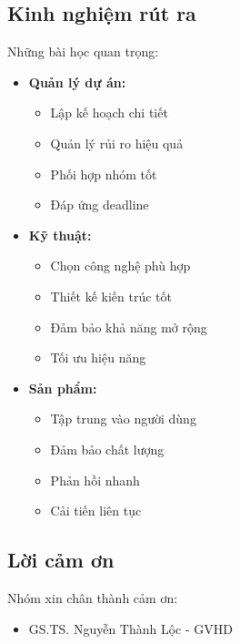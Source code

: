 \subsection{Kinh nghiệm rút ra}
\hspace{0.5cm}Những bài học quan trọng:

\begin{itemize}
    \item \textbf{Quản lý dự án:}
    \begin{itemize}
        \item Lập kế hoạch chi tiết
        \item Quản lý rủi ro hiệu quả
        \item Phối hợp nhóm tốt
        \item Đáp ứng deadline
    \end{itemize}
    
    \item \textbf{Kỹ thuật:}
    \begin{itemize}
        \item Chọn công nghệ phù hợp
        \item Thiết kế kiến trúc tốt
        \item Đảm bảo khả năng mở rộng
        \item Tối ưu hiệu năng
    \end{itemize}
    
    \item \textbf{Sản phẩm:}
    \begin{itemize}
        \item Tập trung vào người dùng
        \item Đảm bảo chất lượng
        \item Phản hồi nhanh
        \item Cải tiến liên tục
    \end{itemize}
\end{itemize}

\subsection{Lời cảm ơn}
\hspace{0.5cm}Nhóm xin chân thành cảm ơn:

\begin{itemize}
    \item GS.TS. Nguyễn Thành Lộc - GVHD
\end{itemize} 